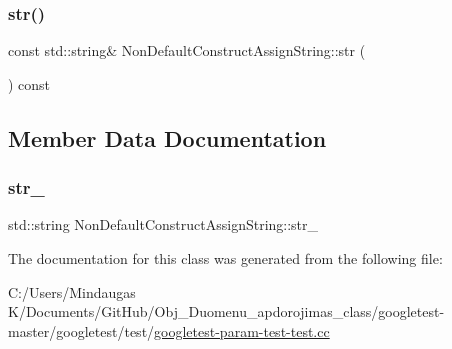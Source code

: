 \mbox{\label{class_non_default_construct_assign_string_a7b428e839204101cb3b7f5b14a66688c}} 
\subsubsection{\texorpdfstring{str()}{str()}\hspace{0.1cm}{\footnotesize\ttfamily [2/2]}}
{\footnotesize\ttfamily const std\+::string\& Non\+Default\+Construct\+Assign\+String\+::str (\begin{DoxyParamCaption}{ }\end{DoxyParamCaption}) const\hspace{0.3cm}{\ttfamily [inline]}}



\subsection{Member Data Documentation}
\mbox{\label{class_non_default_construct_assign_string_a07f7e8d268e2ebb2188ad47471904351}} 
\subsubsection{\texorpdfstring{str\_}{str\_}}
{\footnotesize\ttfamily std\+::string Non\+Default\+Construct\+Assign\+String\+::str\+\_\+\hspace{0.3cm}{\ttfamily [private]}}



The documentation for this class was generated from the following file\+:\begin{DoxyCompactItemize}
\item 
C\+:/\+Users/\+Mindaugas K/\+Documents/\+Git\+Hub/\+Obj\+\_\+\+Duomenu\+\_\+apdorojimas\+\_\+class/googletest-\/master/googletest/test/\mbox{\hyperlink{googletest-master_2googletest_2test_2googletest-param-test-test_8cc}{googletest-\/param-\/test-\/test.\+cc}}\end{DoxyCompactItemize}
